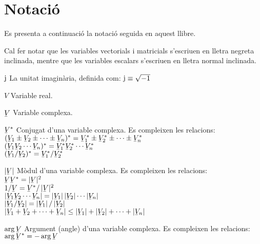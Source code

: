 \chapter*{Notació} 

Es presenta a continuació la notació seguida en aquest llibre.

Cal fer notar que les variables vectorials i matricials s'escriuen
en lletra negreta inclinada,  mentre que les variables escalars
s'escriuen en lletra normal inclinada.

\begin{list}{}
{\setlength{\labelwidth}{15mm} \setlength{\leftmargin}{20mm}
\setlength{\labelsep}{5mm}}
    \item[$\mathrm{j}$] La unitat imaginària, definida com:
    $\mathrm{j}\equiv\sqrt{-1}$
    \item[$V$] Variable real.
    \item[$\cmplx{V}$] Variable complexa.
    \item[$\cmplx{V}^*$] Conjugat d'una variable complexa.
    Es compleixen les relacions:\\[1ex]
     $(\cmplx{V}_1 \pm \cmplx{V}_2 \pm \cdots  \pm \cmplx{V}_n)^* = \cmplx{V}_1^* \pm
    \cmplx{V}_2^*\pm\cdots\pm\cmplx{V}_n^*$\\[1ex]
    $(\cmplx{V}_1 \cmplx{V}_2 \cdots \cmplx{V}_n)^* = \cmplx{V}_1^*  \cmplx{V}_2^*
    \cdots \cmplx{V}_n^*$\\[1ex]
    $(\cmplx{V}_1 / \cmplx{V}_2)^* = \cmplx{V}_1^* / \cmplx{V}_2^*$
    \item[$|\cmplx{V}|$] Mòdul d'una variable complexa.
    Es compleixen les relacions:\\[1ex]
      $\cmplx{V}\cmplx{V}^* = |\cmplx{V}|^2$\\[1ex]
      $1/ \cmplx{V} = \cmplx{V}^* / \,|\cmplx{V}|^2$\\[1ex]
      $|\cmplx{V}_1 \cmplx{V}_2 \cdots \cmplx{V}_n| =
       |\cmplx{V}_1| \,|\cmplx{V}_2| \cdots |\cmplx{V}_n|$\\[1ex]
       $|\cmplx{V}_1 / \cmplx{V}_2| = |\cmplx{V}_1| \,/ \,|\cmplx{V}_2|$\\[1ex]
      $|\cmplx{V}_1+\cmplx{V}_2+\cdots+\cmplx{V}_n| \leq
      |\cmplx{V}_1| + |\cmplx{V}_2| + \cdots  +|\cmplx{V}_n|$
    \item[$\arg\cmplx{V}$] Argument (angle) d'una variable complexa.
     Es compleixen les relacions:\\[1ex]
      $\arg\cmplx{V}^* = - \arg\cmplx{V}$\\[1ex]

\end{list}
